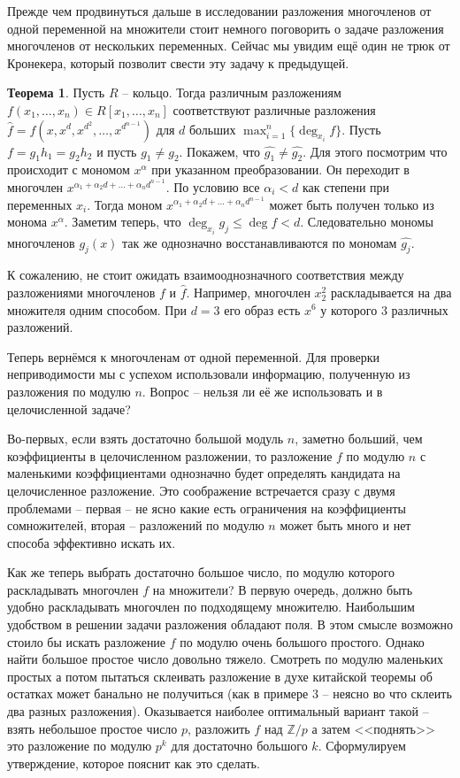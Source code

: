 \documentclass[10pt,a4paper,oneside]{book}
\theoremstyle{definition}
\newtheorem{thm}{{\color{red!40!black} Теорема}}
\newcommand{\mb}[1]{\mathbb{#1}}
\def\thrm{\begin{thm}}
\def\ethrm{\end{thm}}
\begin{document}
Прежде чем продвинуться дальше в исследовании разложения многочленов от одной переменной на множители стоит немного поговорить о задаче разложения многочленов от нескольких переменных. Сейчас мы увидим ещё один не трюк от Кронекера, который позволит свести эту задачу к предыдущей.

\thrm Пусть $R$ -- кольцо. Тогда различным разложениям $f(x_1,\dots,x_n)\in R[x_1,\dots,x_n]$   соответствуют различные разложения $\hat{f}=f(x, x^d, x^{d^2}, \dots, x^{d^{n-1}})$ для $d$ больших $\max_{i=1}^n \{\deg_{x_i} f\}$.
\proof Пусть $f=g_1h_1=g_2h_2$ и пусть $g_1\neq g_2$. Покажем, что $\hat{g_1}\neq \hat{g_2}$. Для этого посмотрим что происходит с мономом $x^{\alpha}$ при указанном преобразовании. Он переходит в многочлен $x^{\alpha_1+\alpha_2d+\dots+\alpha_n d^{n-1}}$. По условию все $\alpha_i<d$ как степени при переменных $x_i$. Тогда моном $x^{\alpha_1+\alpha_2d+\dots+\alpha_n d^{n-1}}$ может быть получен только из монома $x^{\alpha}$. Заметим теперь, что $\deg_{x_i} g_j \leq \deg f <d$. Следовательно мономы многочленов $g_j(x)$ так же однозначно восстанавливаются по мономам $\hat{g_j}$.
\endproof
\ethrm

К сожалению, не стоит ожидать взаимооднозначного соответствия между разложениями многочленов $f$ и $\hat{f}$. Например, многочлен $x_2^2$ раскладывается на два множителя одним способом. При $d=3$ его образ есть $x^6$ у которого 3 различных разложений.

Теперь вернёмся к многочленам от одной переменной. Для проверки неприводимости мы с успехом использовали информацию, полученную из разложения по модулю $n$. Вопрос -- нельзя ли её же использовать и в целочисленной задаче? 

Во-первых, если взять достаточно большой модуль $n$, заметно больший, чем коэффициенты в целочисленном разложении, то разложение $f$ по модулю $n$ с маленькими коэффициентами однозначно будет определять кандидата на целочисленное разложение. Это соображение встречается сразу с двумя проблемами -- первая -- не ясно какие есть ограничения на коэффициенты сомножителей, вторая -- разложений по модулю $n$ может быть много и нет способа эффективно искать их.



Как же теперь выбрать достаточно большое число, по модулю которого раскладывать многочлен $f$ на множители? В первую очередь, должно быть удобно раскладывать многочлен по подходящему множителю. Наибольшим удобством в решении задачи разложения обладают поля. В этом смысле возможно стоило бы искать разложение $f$ по модулю очень большого простого. Однако найти большое простое число довольно тяжело. Смотреть по модулю маленьких простых а потом пытаться склеивать разложение в духе китайской теоремы об остатках может банально не получиться (как в примере 3 -- неясно во что склеить два разных разложения). Оказывается наиболее оптимальный вариант такой -- взять небольшое простое число $p$, разложить $f$ над $\mb Z/p$ а затем <<поднять>> это разложение по модулю $p^k$ для достаточно большого $k$. Сформулируем утверждение, которое пояснит как это сделать.
\end{document}
